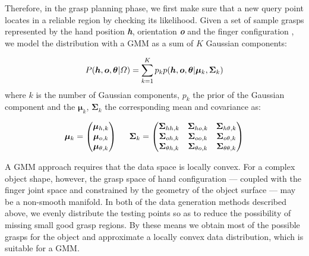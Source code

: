Therefore, in the grasp planning phase, we first make sure that a new query point locates in a reliable region by checking its likelihood.
Given a set of sample grasps represented by the hand position \textbf{\emph{h}},  orientation \textbf{\emph{o}} and the finger configuration \boldsymbol{$\theta$}, we model the distribution with a GMM as a sum of $K$ Gaussian components:


\begin{equation}
{
P (\boldsymbol{h},\boldsymbol{o},\boldsymbol\theta \text{\textbar} \varOmega)
= \sum_{k=1}^K {p_{k}p(\boldsymbol{h},\boldsymbol{o},\boldsymbol{\theta} \text{\textbar} {\boldsymbol{\mu}_k}, {\boldsymbol{\Sigma}_k})}
}
\end{equation}
where $k$ is the number of Gaussian components, $p_k$ the prior of the Gaussian component and the $\boldsymbol{\mu}_k$, $\boldsymbol{\Sigma}_k$ the corresponding mean and covariance as:

\begin{equation}
{
\boldsymbol{\mu}_k = \begin{pmatrix}    \boldsymbol{\mu}_{h,k}     \\
                                        \boldsymbol{\mu}_{o,k}          \\
                                        \boldsymbol{\mu}_{\theta,k}
                    \end{pmatrix}
\hspace{0.2in}
\boldsymbol{\Sigma}_k = \begin{pmatrix}     \boldsymbol{\Sigma}_{hh,k}  & \boldsymbol{\Sigma}_{ho,k} & \boldsymbol{\Sigma}_{h\theta,k}  \\
                                            \boldsymbol{\Sigma}_{oh,k}  & \boldsymbol{\Sigma}_{oo,k}  & \boldsymbol{\Sigma}_{o\theta,k} \\
                                            \boldsymbol{\Sigma}_{\theta{h},k}   & \boldsymbol{\Sigma}_{\theta{o},k}   & \boldsymbol{\Sigma}_{\theta{\theta},k}
                        \end{pmatrix}
}
\end{equation}

A GMM approach requires that the data space is locally convex. For a complex object shape, however, the grasp space of hand configuration --- coupled with the finger joint space and constrained by the geometry of the object surface --- may be a non-smooth manifold. In both of the data generation methods described above, we evenly distribute the testing points so as to reduce the possibility of missing small good grasp regions. By these means we obtain most of the possible grasps for the object and approximate a locally convex data distribution, which is suitable for a GMM.

